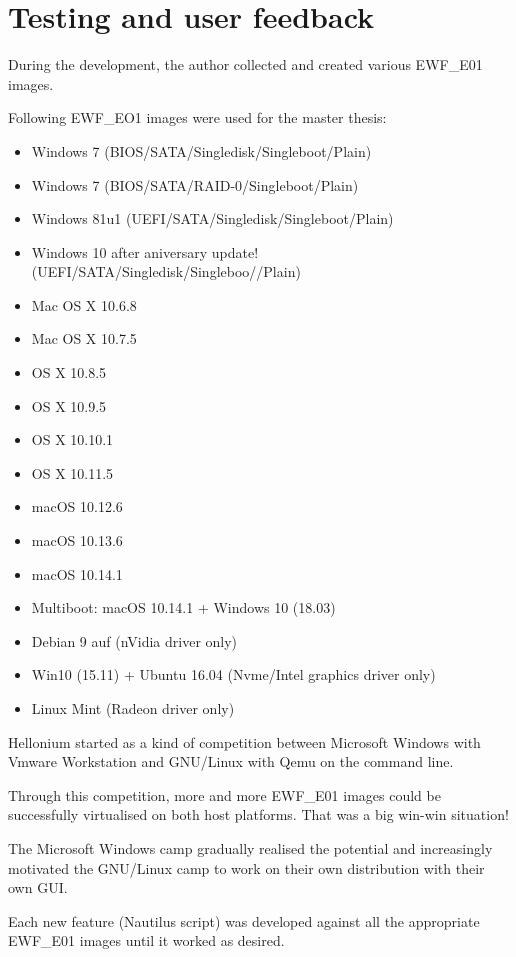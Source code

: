 \chapter{Testing and user feedback}
\label{chap:testing}

During the development, the author collected and created various EWF\_E01 images.

Following EWF\_EO1 images were used for the master thesis:

\begin{itemize}
    \item Windows 7 (BIOS/SATA/Singledisk/Singleboot/Plain)
    \item Windows 7 (BIOS/SATA/RAID-0/Singleboot/Plain)
    \item Windows 81u1 (UEFI/SATA/Singledisk/Singleboot/Plain)
    \item Windows 10 after aniversary update! (UEFI/SATA/Singledisk/Singleboo//Plain)
    \item Mac OS X 10.6.8
    \item Mac OS X 10.7.5
    \item OS X 10.8.5
    \item OS X 10.9.5
    \item OS X 10.10.1
    \item OS X 10.11.5
    \item macOS 10.12.6
    \item macOS 10.13.6
    \item macOS 10.14.1
    \item Multiboot: macOS 10.14.1 + Windows 10 (18.03)
    \item Debian 9 auf (nVidia driver only)
    \item Win10 (15.11) + Ubuntu 16.04 (Nvme/Intel graphics driver only)
    \item Linux Mint (Radeon driver only)
\end{itemize}

Hellonium started as a kind of competition between Microsoft Windows with Vmware Workstation and GNU/Linux with Qemu on the command line.

Through this competition, more and more EWF\_E01 images could be successfully virtualised on both host platforms. That was a big win-win situation!

The Microsoft Windows camp gradually realised the potential and increasingly motivated the GNU/Linux camp to work on their own distribution with their own GUI.

Each new feature (Nautilus script) was developed against all the appropriate EWF\_E01 images until it worked as desired.

